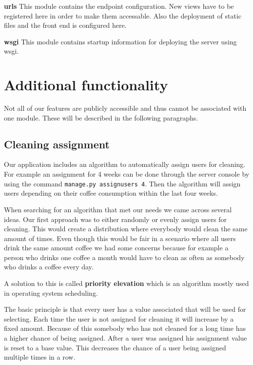 \textbf{urls} This module contains the endpoint configuration. New views
have to be registered here in order to make them accessable. Also the
deployment of static files and the front end is configured here.

\textbf{wsgi} This module contains startup information for deploying the
server using wsgi.

\newpage
\section{Additional functionality}\label{additional-functionality}

Not all of our features are publicly accessible and thus cannot be
associated with one module. These will be described in the following
paragraphs.

\subsection{Cleaning assignment}\label{cleaning-assignment}

Our application includes an algorithm to automatically assign users for
cleaning. For example an assignment for 4 weeks can be done through the
server console by using the command \texttt{manage.py\ assignusers\ 4}.
Then the algorithm will assign users depending on their coffee
consumption within the last four weeks.

When searching for an algorithm that met our needs we came across
several ideas. Our first approach was to either randomly or evenly
assign users for cleaning. This would create a distribution where
everybody would clean the same amount of times. Even though this would
be fair in a scenario where all users drink the same amount coffee we
had some concerns because for example a person who drinks one coffee a
month would have to clean as often as somebody who drinks a coffee every
day.

A solution to this is called \textbf{priority elevation} which is an
algorithm mostly used in operating system scheduling.

The basic principle is that every user has a value associated that will
be used for selecting. Each time the user is not assigned for cleaning
it will increase by a fixed amount. Because of this somebody who has not
cleaned for a long time has a higher chance of being assigned. After a
user was assigned his assignment value is reset to a base value. This
decreases the chance of a user being assigned multiple times in a row.

